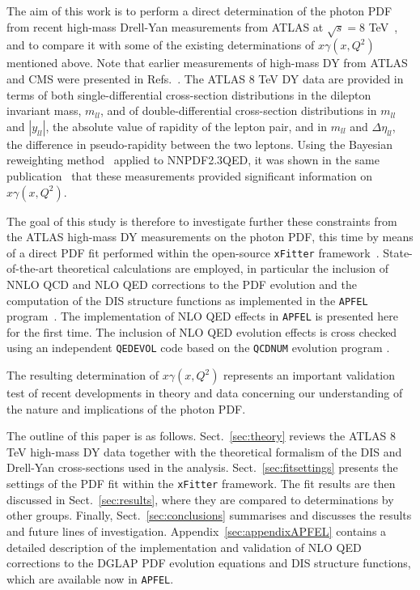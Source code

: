 The aim of this work is to perform a direct determination of the
photon PDF from recent high-mass Drell-Yan measurements from
ATLAS  at $\sqrt{s}=8$ TeV~\cite{Aad:2016zzw}, and to
compare it with some of the existing determinations of $x\gamma(x,Q^2)$
mentioned above.
%
Note that
earlier measurements of high-mass DY from ATLAS and CMS were presented
in Refs.~\cite{CMS:2014jea,Chatrchyan:2013tia,Aad:2013iua}.
%
The ATLAS 8 TeV DY data are provided in terms of both
single-differential cross-section distributions in the dilepton invariant mass,
$m_{ll}$, and of double-differential 
cross-section distributions in $m_{ll}$ and $|y_{ll}|$, the absolute value of rapidity of the
lepton pair, and in $m_{ll}$ and $\Delta\eta_{ll}$, the difference in
pseudo-rapidity between the two leptons.
%
Using the Bayesian reweighting method~\cite{Ball:2011gg,Ball:2010gb}
applied to NNPDF2.3QED, it was shown in the
same publication~\cite{Aad:2016zzw} that these
measurements provided significant information on $x\gamma(x,Q^2)$.

The goal of this study is therefore to investigate further these
constraints from the ATLAS high-mass DY measurements on the photon PDF,
this time by means of a direct PDF fit performed within the
open-source {\tt xFitter} framework~\cite{Alekhin:2014irh}.
%
State-of-the-art theoretical calculations are employed, in particular
the inclusion of  NNLO QCD and NLO QED corrections to the PDF evolution and
the computation of the DIS structure
functions as implemented in the {\tt APFEL} program~\cite{Bertone:2013vaa}.
%
The implementation of NLO QED effects in {\tt APFEL} is
presented here for
the first time.
%
The inclusion of NLO QED evolution effects is cross checked using an independent
{\tt QEDEVOL} code \cite{Sadykov:2014aua} based on the {\tt QCDNUM} evolution program \cite{Botje:2010ay}.

%
The resulting determination of $x\gamma(x,Q^2)$
represents an important validation test of
recent developments in theory and data concerning
our understanding of the nature and implications
of the photon PDF.

The outline of this paper is as follows.
%
Sect.~\ref{sec:theory} reviews the ATLAS 8 TeV high-mass DY data together
with the theoretical formalism of the DIS and Drell-Yan cross-sections
used in the analysis.
%
Sect.~\ref{sec:fitsettings} presents the settings of the PDF
fit within the {\tt xFitter} framework.
% 
The fit results are then discussed in Sect.~\ref{sec:results}, where
they are compared to determinations by other groups.
%
Finally, Sect.~\ref{sec:conclusions} summarises and discusses the results and
future lines of investigation.
%
Appendix~\ref{sec:appendixAPFEL} contains a detailed
description of the implementation and validation of NLO QED
corrections to the DGLAP PDF evolution equations
and DIS structure functions, which are
available now in {\tt APFEL}.
